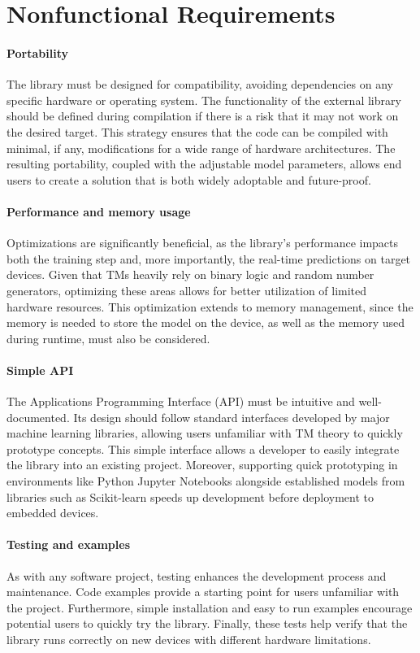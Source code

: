 \section{Nonfunctional Requirements}

\paragraph{Portability}
The library must be designed for compatibility, avoiding dependencies on any specific hardware or operating system. The functionality of the external library should be defined during compilation if there is a risk that it may not work on the desired target. This strategy ensures that the code can be compiled with minimal, if any, modifications for a wide range of hardware architectures. The resulting portability, coupled with the adjustable model parameters, allows end users to create a solution that is both widely adoptable and future-proof.

\paragraph{Performance and memory usage}
Optimizations are significantly beneficial, as the library's performance impacts both the training step and, more importantly, the real-time predictions on target devices. Given that TMs heavily rely on binary logic and random number generators, optimizing these areas allows for better utilization of limited hardware resources. This optimization extends to memory management, since the memory is needed to store the model on the device, as well as the memory used during runtime, must also be considered.

\paragraph{Simple API}
The Applications Programming Interface (API) must be intuitive and well-documented. Its design should follow standard interfaces developed by major machine learning libraries, allowing users unfamiliar with TM theory to quickly prototype concepts. This simple interface allows a developer to easily integrate the library into an existing project. Moreover, supporting quick prototyping in environments like Python Jupyter Notebooks alongside established models from libraries such as Scikit-learn speeds up development before deployment to embedded devices.

\paragraph{Testing and examples}
As with any software project, testing enhances the development process and maintenance. Code examples provide a starting point for users unfamiliar with the project. Furthermore, simple installation and easy to run examples encourage potential users to quickly try the library. Finally, these tests help verify that the library runs correctly on new devices with different hardware limitations.